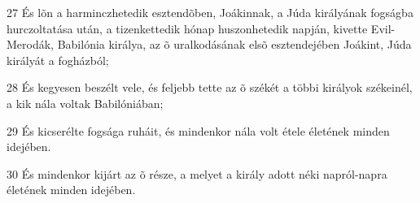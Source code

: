 \par 27 És lõn a harminczhetedik esztendõben, Joákinnak, a Júda királyának fogságba hurczoltatása után, a tizenkettedik hónap huszonhetedik napján, kivette Evil-Merodák, Babilónia királya, az õ uralkodásának elsõ esztendejében Joákint, Júda királyát a fogházból;
\par 28 És kegyesen beszélt vele, és feljebb tette az õ székét a többi királyok székeinél, a kik nála voltak Babilóniában;
\par 29 És kicserélte fogsága ruháit, és mindenkor nála volt étele életének minden idejében.
\par 30 És mindenkor kijárt az õ része, a melyet a király adott néki napról-napra életének minden idejében.


